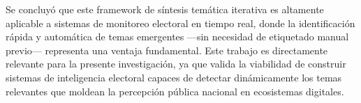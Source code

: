 Se concluyó que este framework de síntesis temática iterativa es altamente aplicable a sistemas de monitoreo electoral en tiempo real, donde la identificación rápida y automática de temas emergentes —sin necesidad de etiquetado manual previo— representa una ventaja fundamental. Este trabajo es directamente relevante para la presente investigación, ya que valida la viabilidad de construir sistemas de inteligencia electoral capaces de detectar dinámicamente los temas relevantes que moldean la percepción pública nacional en ecosistemas digitales.